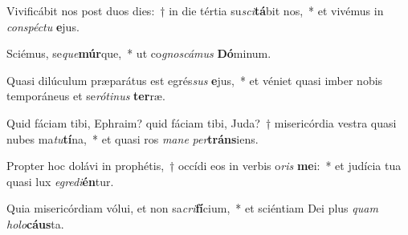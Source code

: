 \item Vivificábit nos post duos dies:~† in die tértia su\textit{sci}\textbf{tá}bit nos,~* et vivémus in \textit{con}\textit{spéc}\textit{tu} \textbf{e}jus.
\item Sciémus, se\textit{que}\textbf{múr}que,~* ut co\textit{gnos}\textit{cá}\textit{mus} \textbf{Dó}minum.
\item Quasi dilúculum præparátus est egrés\textit{sus} \textbf{e}jus,~* et véniet quasi imber nobis temporáneus et se\textit{ró}\textit{ti}\textit{nus} \textbf{ter}ræ.
\item Quid fáciam tibi, Ephraim? quid fáciam tibi, Juda?~† misericórdia vestra quasi nubes ma\textit{tu}\textbf{tí}na,~* et quasi ros \textit{ma}\textit{ne} \textit{per}\textbf{tráns}iens.
\item Propter hoc dolávi in prophétis,~† occídi eos in verbis o\textit{ris} \textbf{me}i:~* et judícia tua quasi lux \textit{e}\textit{gre}\textit{di}\textbf{én}tur.
\item Quia misericórdiam vólui, et non sa\textit{cri}\textbf{fí}cium,~* et sciéntiam Dei plus \textit{quam} \textit{ho}\textit{lo}\textbf{cáus}ta.
